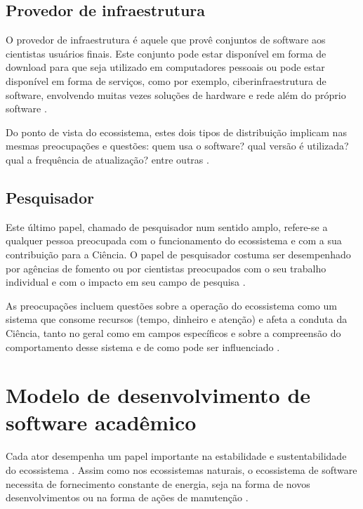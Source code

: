 \subsection{Provedor de infraestrutura}

O provedor de infraestrutura é aquele que provê conjuntos de software aos
cientistas usuários finais. Este conjunto pode estar disponível em forma de
download para que seja utilizado em computadores pessoais ou pode estar
disponível em forma de serviços, como por exemplo, ciberinfraestrutura
de software, envolvendo muitas vezes soluções de hardware e rede além do
próprio software \cite{council2007cyberinfrastructure, stewart2010cyberinfrastructure}.

Do ponto de vista do ecossistema, estes dois tipos de distribuição implicam nas
mesmas preocupações e questões: quem usa o software? qual versão é utilizada? 
qual a frequência de atualização? entre outras \cite{howison2015understanding}.

\subsection{Pesquisador}

Este último papel, chamado de pesquisador num sentido amplo, refere-se a
qualquer pessoa preocupada com o funcionamento do ecossistema e com a sua
contribuição para a Ciência. O papel de pesquisador costuma ser desempenhado
por agências de fomento ou por cientistas preocupados com o seu trabalho
individual e com o impacto em seu campo de pesquisa
\cite{howison2015understanding}.

As preocupações incluem questões sobre a operação do ecossistema
como um sistema que consome recursos (tempo, dinheiro e atenção) e afeta a
conduta da Ciência, tanto no geral como em campos específicos
e sobre a compreensão do comportamento desse sistema e de 
como pode ser influenciado \cite{howison2015understanding}.

\section{Modelo de desenvolvimento de software acadêmico}
\label{sec:modelosa}

Cada ator desempenha um papel importante na estabilidade e sustentabilidade do
ecossistema \cite{dhungana2010software}. Assim como nos ecossistemas naturais,
o ecossistema de software necessita de fornecimento constante de energia, seja
na forma de novos desenvolvimentos ou na forma de ações de manutenção
\cite{dhungana2010software}.

